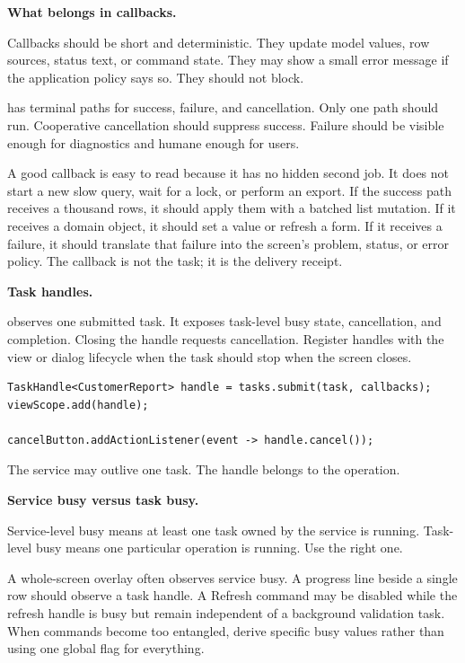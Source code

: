 \textbf{What belongs in callbacks.}

Callbacks should be short and deterministic. They update model values, row
sources, status text, or command state. They may show a small error message if
the application policy says so. They should not block.

 has terminal paths for success, failure, and cancellation.
Only one path should run. Cooperative cancellation should suppress success.
Failure should be visible enough for diagnostics and humane enough for users.

A good callback is easy to read because it has no hidden second job. It does
not start a new slow query, wait for a lock, or perform an export. If the
success path receives a thousand rows, it should apply them with a batched list
mutation. If it receives a domain object, it should set a value or refresh a
form. If it receives a failure, it should translate that failure into the
screen's problem, status, or error policy. The callback is not the task; it is
the delivery receipt.

\textbf{Task handles.}

 observes one submitted task. It exposes task-level busy
state, cancellation, and completion. Closing the handle requests cancellation.
Register handles with the view or dialog lifecycle when the task should stop
when the screen closes.

\begin{lstlisting}[caption={A view scope owns task handles.}]
TaskHandle<CustomerReport> handle = tasks.submit(task, callbacks);
viewScope.add(handle);

cancelButton.addActionListener(event -> handle.cancel());
\end{lstlisting}

The service may outlive one task. The handle belongs to the operation.

\textbf{Service busy versus task busy.}

Service-level busy means at least one task owned by the service is running.
Task-level busy means one particular operation is running. Use the right one.

A whole-screen overlay often observes service busy. A progress line beside a
single row should observe a task handle. A Refresh command may be disabled while
the refresh handle is busy but remain independent of a background validation
task. When commands become too entangled, derive specific busy values rather
than using one global flag for everything.

